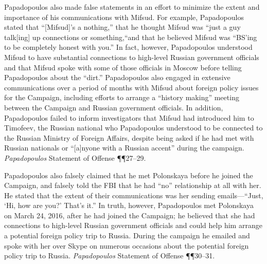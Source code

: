 Papadopoulos also made false statements in an effort to minimize the extent and importance of his communications with Mifsud.
For example, Papadopoulos stated that ``[Mifsud]'s a nothing,'' that he thought Mifsud was ``just a guy talk[ing] up connections or something,``and that he believed Mifsud was ``BS'ing to be completely honest with you.''
In fact, however, Papadopoulos understood Mifsud to have substantial connections to high-level Russian government officials and that Mifsud spoke with some of those officials in Moscow before telling Papadopoulos about the ``dirt.''
Papadopoulos also engaged in extensive communications over a period of months with Mifsud about foreign policy issues for the Campaign, including efforts to arrange a ``history making'' meeting between the Campaign and Russian government officials.
In addition, Papadopoulos failed to inform investigators that Mifsud had introduced him to Timofeev, the Russian national who Papadopoulos understood to be connected to the Russian Ministry of Foreign Affairs, despite being asked if he had met with Russian nationals or ``[a]nyone with a Russian accent'' during the campaign.
\textit{Papadopoulos} Statement of Offense \P\P 27--29.

Papadopoulos also falsely claimed that he met Polonskaya before he joined the Campaign, and falsely told the FBI that he had ``no'' relationship at all with her.
He stated that the extent of their communications was her sending emails---``Just, `Hi, how are you?' That's it.''
In truth, however, Papadopoulos met Polonskaya on March 24, 2016, after he had joined the Campaign; he believed that she had connections to high-level Russian government officials and could help him arrange a potential foreign policy trip to Russia.
During the campaign he emailed and spoke with her over Skype on numerous occasions about the potential foreign policy trip to Russia.
\textit{Papadopoulos} Statement of Offense \P\P 30--31.

